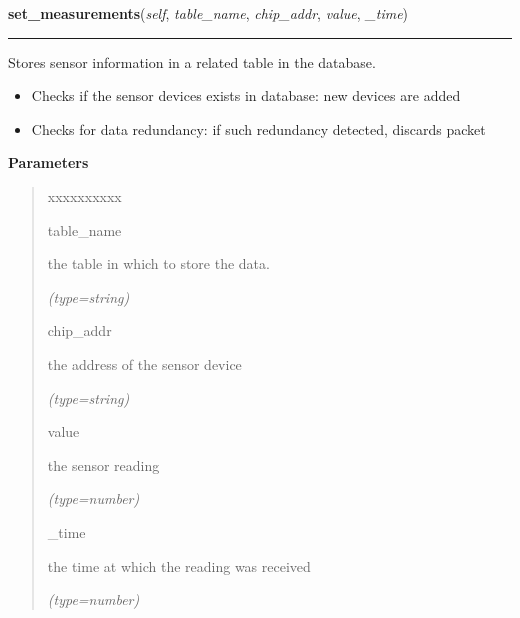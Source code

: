 \hspace{.8\funcindent}\begin{boxedminipage}{\funcwidth}

    \raggedright \textbf{set\_measurements}(\textit{self}, \textit{table\_name}, \textit{chip\_addr}, \textit{value}, \textit{\_time})

    \vspace{-1.5ex}

    \rule{\textwidth}{0.5\fboxrule}
\setlength{\parskip}{2ex}
    Stores sensor information in a related table in the database.

    \begin{itemize}
    \setlength{\parskip}{0.6ex}
      \item Checks if the sensor devices exists in database: new devices are 
        added

      \item Checks for data redundancy: if such redundancy detected, discards 
        packet

    \end{itemize}

\setlength{\parskip}{1ex}
      \textbf{Parameters}
      \vspace{-1ex}

      \begin{quote}
        \begin{Ventry}{xxxxxxxxxx}

          \item[table\_name]

          the table in which to store the data.

            {\it (type=string)}

          \item[chip\_addr]

          the address of the sensor device

            {\it (type=string)}

          \item[value]

          the sensor reading

            {\it (type=number)}

          \item[\_time]

          the time at which the reading was received

            {\it (type=number)}

        \end{Ventry}

      \end{quote}

    \end{boxedminipage}

